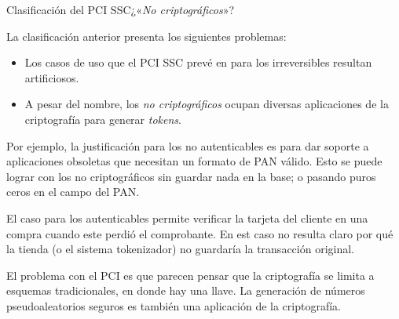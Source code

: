 \begin{frame}{Clasificación del PCI SSC}{¿«\textit{No criptográficos}»?}

  La clasificación anterior presenta los siguientes problemas:

  \begin{itemize}
    \item<1-> Los casos de uso que el PCI SSC prevé en \cite{pci_tokens} para
      los irreversibles resultan artificiosos.
    \item<2-> A pesar del nombre, los \textit{no criptográficos} ocupan
      diversas aplicaciones de la criptografía para generar \textit{tokens}.
  \end{itemize}

  {
    Por ejemplo, la justificación para los no autenticables es para dar
    soporte a aplicaciones obsoletas que necesitan un formato de PAN
    válido. Esto se puede lograr con los no criptográficos sin guardar
    nada en la base; o pasando puros ceros en el campo del PAN.

    El caso para los autenticables permite verificar la tarjeta del cliente
    en una compra cuando este perdió el comprobante. En est caso no resulta
    claro por qué la tienda (o el sistema tokenizador) no guardaría
    la transacción original.
  }

  {
    El problema con el PCI es que parecen pensar que la criptografía se
    limita a esquemas tradicionales, en donde hay una llave. La
    generación de números pseudoaleatorios seguros es también una
    aplicación de la criptografía.
  }

\end{frame}

